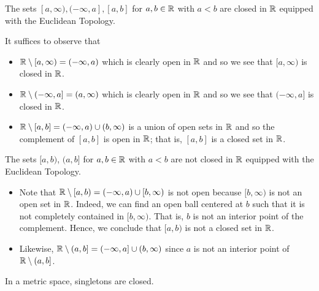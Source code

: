 \documentclass[a4paper]{article}
\begin{document}
\begin{eg}
        The sets \( [a,\infty), (-\infty ,a], [a,b]  \) for \( a,b \in \mathbb{R}  \) with \( a < b  \) are closed in \( \mathbb{R}  \) equipped with the Euclidean Topology. 

           It suffices to observe that 
           \begin{itemize}
               \item \( \mathbb{R} \setminus  [a,\infty) = (-\infty , a)  \) which is clearly open in \( \mathbb{R}  \) and so we see that \( [a,\infty) \) is closed in \( \mathbb{R}  \).
               \item \( \mathbb{R} \setminus  (-\infty , a] = (a,\infty )  \) which is clearly open in \( \mathbb{R}  \) and so we see that \( (-\infty , a]  \) is closed in \( \mathbb{R}  \).
               \item \( \mathbb{R} \setminus  [a,b] = (-\infty , a) \cup (b,\infty )  \) is a union of open sets in \( \mathbb{R}  \) and so the complement of \( [a,b] \) is open in \( \mathbb{R}  \); that is, \( [a,b] \) is a closed set in \(\mathbb{R} \).
           \end{itemize}
\end{eg}

   \begin{eg}
       The sets \( [a,b) \), \( (a,b] \) for \( a,b \in \mathbb{R}  \) with \( a < b  \) are not closed in \( \mathbb{R}  \) equipped with the Euclidean Topology.
           \begin{itemize}
               \item Note that \( \mathbb{R} \setminus  [a,b) = (-\infty , a) \cup [b,\infty)  \) is not open because \( [b,\infty) \) is not an open set in \( \mathbb{R}  \). Indeed, we can find an open ball centered at \( b  \) such that it is not completely contained in \( [b,\infty) \). That is, \( b  \) is not an interior point of the complement. Hence, we conclude that \( [a,b) \) is not a closed set in \( \mathbb{R}  \).
               \item  Likewise, \(\mathbb{R} \setminus  (a,b] = (-\infty , a] \cup (b, \infty )  \) since \( a  \) is not an interior point of \( \mathbb{R} \setminus  (a,b] \).
            \end{itemize}
    \end{eg}

    \begin{eg}
       In a metric space, singletons are closed.
    \end{eg}
\end{document}
